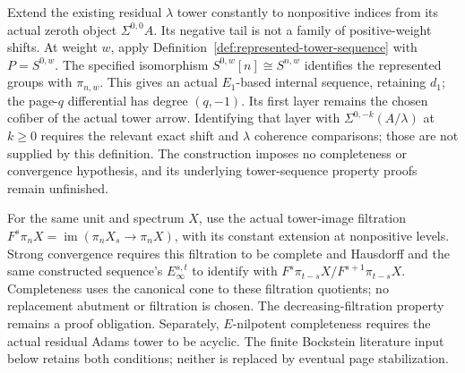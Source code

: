 \begin{definition}
  \label{def:lambda-weightwise-sequence}
  \notready
  Extend the existing residual $\lambda$ tower constantly to nonpositive
  indices from its actual zeroth object $\Sigma^{0,0}A$. Its negative tail
  is not a family of positive-weight shifts. At weight $w$, apply
  Definition~\ref{def:represented-tower-sequence} with $P=S^{0,w}$.
  The specified isomorphism $S^{0,w}[n]\cong S^{n,w}$ identifies the
  represented groups with $\pi_{n,w}$.
  This gives an actual $E_1$-based internal sequence, retaining $d_1$;
  the page-$q$ differential has degree $(q,-1)$. Its first layer remains the chosen cofiber
  of the actual tower arrow. Identifying that layer with
  $\Sigma^{0,-k}(A/\lambda)$ at $k\ge0$ requires the relevant exact shift and
  $\lambda$ coherence comparisons; those are not supplied by this definition.
  The construction imposes no completeness or convergence hypothesis, and
  its underlying tower-sequence property proofs remain unfinished.
\end{definition}

\begin{definition}
  \label{def:actual-adams-strong-convergence}
  \notready
  For the same unit and spectrum $X$, use the actual tower-image filtration
  $F^s\pi_nX=\operatorname{im}(\pi_nX_s\to\pi_nX)$, with its constant
  extension at nonpositive levels. Strong convergence requires this
  filtration to be complete and Hausdorff and the same constructed
  sequence's $E_\infty^{s,t}$ to identify with
  $F^s\pi_{t-s}X/F^{s+1}\pi_{t-s}X$.
  Completeness uses the canonical cone to these filtration quotients;
  no replacement abutment or filtration is chosen. The decreasing-filtration
  property remains a proof obligation.
  Separately, $E$-nilpotent completeness requires the actual residual Adams
  tower to be acyclic. The finite Bockstein literature input below retains
  both conditions; neither is replaced by eventual page stabilization.
\end{definition}

